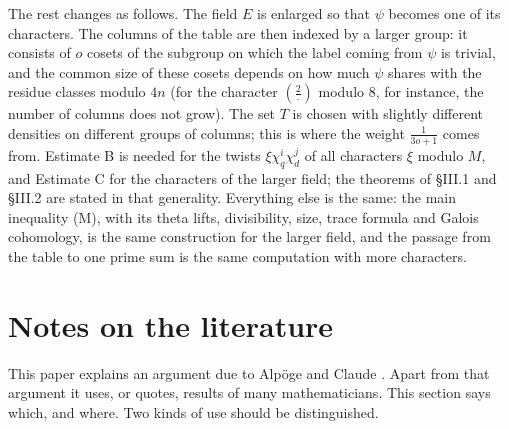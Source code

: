 \documentclass[11pt,letterpaper]{article}
\begin{document}
The rest changes as follows. The field $E$ is enlarged so that $\psi$ becomes one of its characters. The columns of the table are then indexed by a larger group: it consists of $o$ cosets of the subgroup on which the label coming from $\psi$ is trivial, and the common size of these cosets depends on how much $\psi$ shares with the residue classes modulo $4n$ (for the character $(\frac2\cdot)$ modulo $8$, for instance, the number of columns does not grow). The set $T$ is chosen with slightly different densities on different groups of columns; this is where the weight $\frac1{3o+1}$ comes from. Estimate B is needed for the twists $\xi\chi_q^i\chi_d^j$ of all characters $\xi$ modulo $M$, and Estimate C for the characters of the larger field; the theorems of \S III.1 and \S III.2 are stated in that generality. Everything else is the same: the main inequality (M), with its theta lifts, divisibility, size, trace formula and Galois cohomology, is the same construction for the larger field, and the passage from the table to one prime sum is the same computation with more characters.

\section{Notes on the literature}

This paper explains an argument due to Alp\"oge and Claude \cite{Alp26}. Apart from that argument it uses, or
quotes, results of many mathematicians. This section says which, and where. Two kinds of use should be
distinguished.
\end{document}
